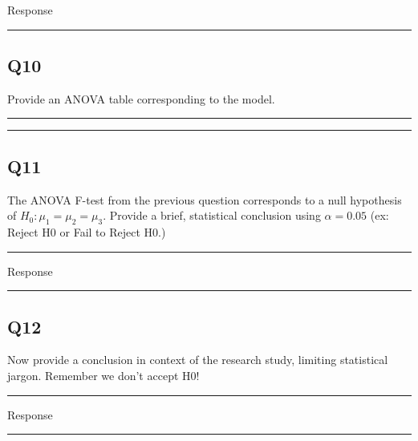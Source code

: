 \documentclass[
]{article}
\begin{document}
Response

\begin{center}\rule{0.5\linewidth}{0.5pt}\end{center}

\hypertarget{q10}{%
\subsection{Q10}\label{q10}}

Provide an ANOVA table corresponding to the model.

\begin{center}\rule{0.5\linewidth}{0.5pt}\end{center}

\begin{center}\rule{0.5\linewidth}{0.5pt}\end{center}

\hypertarget{q11}{%
\subsection{Q11}\label{q11}}

The ANOVA F-test from the previous question corresponds to a null
hypothesis of \(H_0: \mu_1 = \mu_2 = \mu_3\). Provide a brief,
statistical conclusion using \(\alpha = 0.05\) (ex: Reject H0 or Fail to
Reject H0.)

\begin{center}\rule{0.5\linewidth}{0.5pt}\end{center}

Response

\begin{center}\rule{0.5\linewidth}{0.5pt}\end{center}

\hypertarget{q12}{%
\subsection{Q12}\label{q12}}

Now provide a conclusion in context of the research study, limiting
statistical jargon. Remember we don't accept H0!

\begin{center}\rule{0.5\linewidth}{0.5pt}\end{center}

Response

\begin{center}\rule{0.5\linewidth}{0.5pt}\end{center}
\end{document}
